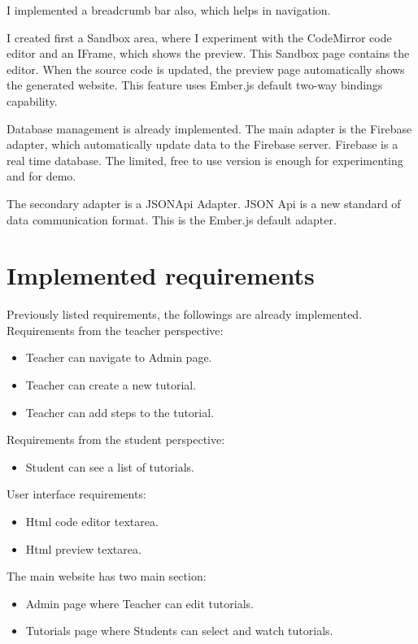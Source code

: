 \documentclass[11pt, a4paper, twoside, openright]{report}
\begin{document}
I implemented a breadcrumb bar also, which helps in navigation.

I created first a Sandbox area, where I experiment with the CodeMirror code editor and an IFrame, which shows the preview. This Sandbox page contains the editor. When the source code is updated, the preview page automatically shows the generated website. This feature uses Ember.js default two-way bindings capability.

Database management is already implemented. The main adapter is the Firebase adapter, which automatically update data to the Firebase server. Firebase is a real time database. The limited, free to use version is enough for experimenting and for demo.

The secondary adapter is a JSONApi Adapter. JSON Api \cite{jsonapi} is a new standard of data communication format. This is the Ember.js default adapter.

\section{Implemented requirements}

Previously listed requirements, the followings are already implemented. \\

\noindent Requirements from the teacher perspective:
\begin{itemize}[noitemsep]
\item {} Teacher can navigate to Admin page.
\item {} Teacher can create a new tutorial.
\item {} Teacher can add steps to the tutorial.
\end{itemize}

\noindent Requirements from the student perspective:
\begin{itemize}[noitemsep]
\item {} Student can see a list of tutorials.
\end{itemize}

\noindent User interface requirements:
\begin{itemize}[noitemsep]
\item {} Html code editor textarea.
\item {} Html preview textarea.
\end{itemize}

\noindent The main website has two main section:
\begin{itemize}
\item {} Admin page where Teacher can edit tutorials.
\item {} Tutorials page where Students can select and watch tutorials.
\end{itemize}
\end{document}
